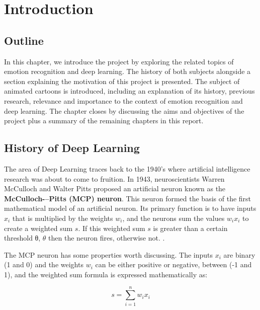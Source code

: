 \documentclass[report, 11pt, oneside]{dissertation}
\begin{document}

\chapter{Introduction} \label{chap:introduction}

\section{Outline}

In this chapter, we introduce the project by exploring the related topics of emotion recognition and deep learning. The history of both subjects alongside a section explaining the motivation of this project is presented. The subject of animated cartoons is introduced, including an explanation of its history, previous research, relevance and importance to the context of emotion recognition and deep learning. The chapter closes by discussing the aims and objectives of the project plus a summary of the remaining chapters in this report.

\section{History of Deep Learning}

The area of Deep Learning traces back to the 1940's where artificial intelligence research was about to come to fruition. In 1943, neuroscientists Warren McCulloch and Walter Pitts proposed an artificial neuron known as the \textbf{McCulloch-–Pitts (MCP) neuron}. This neuron formed the basis of the first mathematical model of an artificial neuron. Its primary function is to have inputs $x_i$ that is multiplied by the weights $w_i$, and the neurons sum  the values $w_ix_i$ to create a weighted sum $ s $. If this weighted sum $ s $ is greater than a certain threshold θ, $ \theta $ then the neuron fires, otherwise not. \citep[41]{Marsland:2014:MLA:2692349}.

The MCP neuron has some properties worth discussing. The inputs $x_i$ are binary (1 and 0) and the weights $w_i$ can be either positive or negative, between (-1 and 1), and the weighted sum formula is expressed mathematically as:

\begin{equation} \label{eq:1}
	s = \sum_{i = 1}^n w_i x_i
\end{equation}
\end{document}
